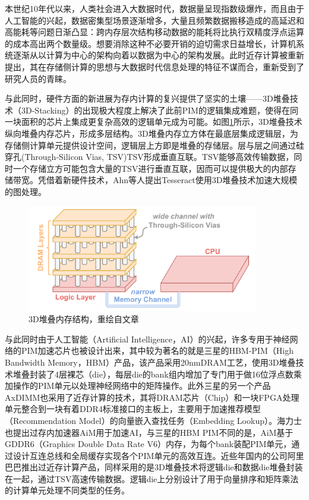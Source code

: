 本世纪10年代以来，人类社会进入大数据时代，数据量呈现指数级爆炸，而且由于人工智能的兴起，数据密集型场景逐渐增多，大量且频繁数据搬移造成的高延迟和高能耗等问题日渐凸显：跨内存层次结构移动数据的能耗将比执行双精度浮点运算的成本高出两个数量级\cite{EnergyCost}。想要消除这种不必要开销的迫切需求日益增长，计算机系统逐渐从以计算为中心的架构向着以数据为中心的架构发展。此时近存计算被重新提出，其在存储侧计算的思想与大数据时代信息处理的特征不谋而合，重新受到了研究人员的青睐。

与此同时，硬件方面的新进展为存内计算的复兴提供了坚实的土壤——3D堆叠技术（3D-Stacking）的出现极大程度上解决了此前PIM的逻辑集成难题，使得在同一块面积的芯片上集成更复杂高效的逻辑单元成为可能。如图\ref{3DStack}所示，3D堆叠技术纵向堆叠内存芯片，形成多层结构。3D堆叠内存立方体在最底层集成逻辑层，为存储侧计算单元提供设计空间，逻辑层上方即是堆叠的存储层。层与层之间通过硅穿孔(Through-Silicon Vias, TSV)TSV形成垂直互联。TSV能够高效传输数据，同时一个存储立方可能包含大量的TSV进行垂直互联，因而可以提供极大的内部存储带宽。凭借着新硬件技术，Ahn等人\cite{Tesseract}提出Tesseract使用3D堆叠技术加速大规模的图处理。

\begin{figure}[!htbp]
	\centering
    \includegraphics[width=0.9\textwidth]{figures/3DStack.pdf}
    \caption[3D堆叠内存结构]{3D堆叠内存结构，重绘自文章\cite{3D-Stack-Fig}}
	\label{3DStack}
\end{figure}

与此同时由于人工智能（Artificial Intelligence，AI）的兴起，许多专用于神经网络的PIM加速芯片也被设计出来，其中较为著名的就是三星的HBM-PIM（High Bandwidth Memory，HBM）产品\cite{SamsungHBMPIM}，该产品采用20nmDRAM工艺，使用3D堆叠技术堆叠封装了4层裸芯（die），每层die的bank组内增加了专门用于做16位浮点数乘加操作的PIM单元以处理神经网络中的矩阵操作。此外三星的另一个产品AxDIMM\cite{AxDIMM}也采用了近存计算的技术，其将DRAM芯片（Chip）和一块FPGA处理单元整合到一块有着DDR4标准接口的主板上，主要用于加速推荐模型（Recommendation Model）的向量嵌入查找任务（Embedding Lookup）。海力士也提出过存内加速器AiM\cite{AiM}用于加速AI，与三星的HBM PIM不同的是，AiM基于GDDR6（Graphics Double Data Rate V6）内存，为每个bank装配PIM单元，通过设计互连总线和全局缓存实现各个PIM单元的高效互连。近些年国内的公司阿里巴巴推出过近存计算产品\cite{AlibabaPIM}，同样采用的是3D堆叠技术将逻辑die和数据die堆叠封装在一起，通过TSV高速传输数据。逻辑die上分别设计了用于向量排序和矩阵乘法的计算单元处理不同类型的任务。

